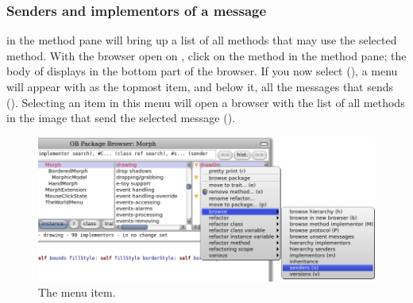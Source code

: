 \documentclass[a4paper,10pt,twoside]{book}
\begin{document}

\subsubsection{Senders and implementors of a message}

  in the method pane will bring up a list of all methods that may use the selected method. With the browser open on , click on the  method in the method pane; the body of  displays in the bottom part of the browser. If you now select  (), a menu will appear with  as the topmost item, and below it, all the messages that  sends ().  Selecting an item in this menu will open a browser with the list of all methods in the image that send the selected message ().


\begin{figure}[htb]
\centerline {\includegraphics[width=\textwidth]{SendersOfDrawOn}}
\caption{The  menu item.}
\end{figure}
\end{document}
